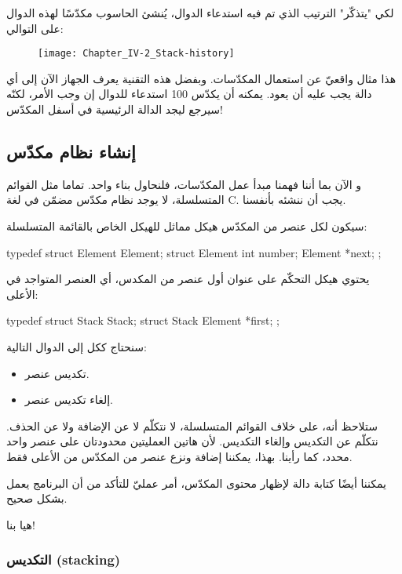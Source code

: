 لكي "يتذكّر" الترتيب الذي تم فيه استدعاء الدوال، يُنشئ الحاسوب مكدّسًا لهذه الدوال على التوالي:

\begin{figure}[H]
	\centering
	\texttt{[image: Chapter\_IV-2\_Stack-history]}
\end{figure}

هذا مثال واقعيّ عن استعمال المكدّسات. وبفضل هذه التقنية يعرف الجهاز الآن إلى أي دالة يجب عليه أن يعود. يمكنه أن يكدّس 100 استدعاء للدوال إن وجب الأمر، لكنّه سيرجع ليجد الدالة الرئيسية في أسفل المكدّس!

\subsection{إنشاء نظام مكدّس}

و الآن بما أننا فهمنا مبدأ عمل المكدّسات، فلنحاول بناء واحد. تماما مثل القوائم المتسلسلة، لا يوجد نظام مكدّس مضمّن في لغة
\textenglish{C}.
يجب أن ننشئه بأنفسنا.

سيكون لكل عنصر من المكدّس هيكل مماثل للهيكل الخاص بالقائمة المتسلسلة:

\begin{Csource}
typedef struct Element Element;
struct Element
{
	int number;
	Element *next;
};
\end{Csource}

يحتوي هيكل التحكّم على عنوان أول عنصر من المكدس، أي العنصر المتواجد في الأعلى:

\begin{Csource}
typedef struct Stack Stack;
struct Stack
{
	Element *first;
};
\end{Csource}

سنحتاج ككل إلى الدوال التالية:

\begin{itemize}
	\item تكديس  عنصر.
	\item إلغاء تكديس عنصر.
\end{itemize}

ستلاحظ أنه، على خلاف القوائم المتسلسلة، لا نتكلّم لا عن الإضافة ولا عن الحذف. نتكلّم عن التكديس وإلغاء التكديس. لأن هاتين العمليتين محدودتان على عنصر واحد محدد، كما رأينا. بهذا، يمكننا إضافة ونزع عنصر من المكدّس من الأعلى فقط.

يمكننا أيضًا كتابة دالة لإظهار محتوى المكدّس، أمر عمليّ للتأكد من أن البرنامج يعمل بشكل صحيح.

هيا بنا!

\subsubsection{التكديس (\textenglish{stacking})}

